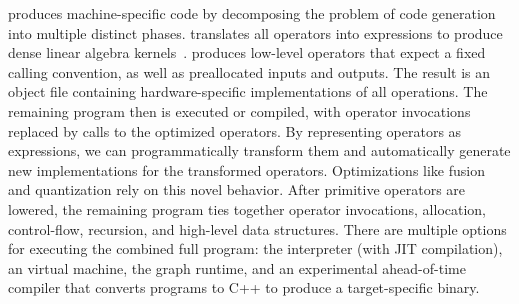 \relay produces machine-specific code
  by decomposing the problem of code generation into multiple distinct phases.
\relay translates all operators into \tvm expressions
  to produce dense linear algebra kernels~\citep{tvm_osdi18, tensor_comprehensions, halide}.
\tvm produces low-level operators that expect a fixed calling convention,
  as well as preallocated inputs and outputs.
The result is an object file containing hardware-specific implementations of all
  operations.
The remaining \relay program then is executed or compiled,
  with operator invocations replaced by calls to the optimized operators.
By representing operators as \tvm expressions, we can programmatically
  transform them and automatically generate new implementations for the transformed operators.
Optimizations like fusion and quantization
  rely on this novel behavior.
After primitive operators are lowered,
  the remaining \relay program ties
  together operator invocations, allocation, control-flow,
  recursion, and high-level data structures.
There are multiple options for executing the combined full program:
  the \relay interpreter (with JIT compilation),
  an \relay virtual machine,
  the \tvm graph runtime,
  and an experimental \relay ahead-of-time compiler
  that converts programs to C++ to produce a target-specific binary.
